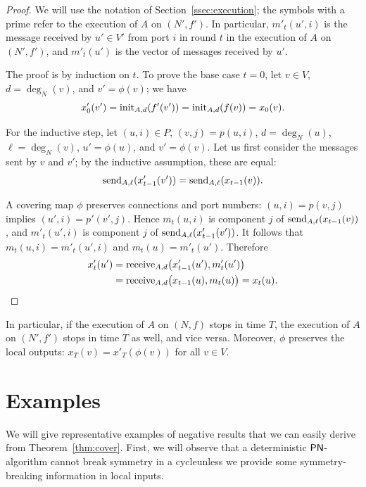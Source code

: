 \begin{proof}
    We will use the notation of Section~\ref{ssec:execution}; the symbols with a prime refer to the execution of $A$ on $(N'\!,f')$. In particular, $m'_t(u',i)$ is the message received by $u' \in V'$ from port $i$ in round $t$ in the execution of $A$ on $(N'\!,f')$, and $m'_t(u')$ is the vector of messages received by $u'$.
    
    The proof is by induction on $t$. To prove the base case $t = 0$, let $v \in V$, $d = \deg_N(v)$, and $v' = \phi(v)$; we have
    \[
        x'_0(v') = \operatorname{init}_{A,d}(f'(v')) = \operatorname{init}_{A,d}(f(v)) = x_0(v).
    \]
    
    For the inductive step, let $(u,i) \in P$, $(v,j) = p(u,i)$, $d = \deg_N(u)$, $\ell = \deg_N(v)$, $u' = \phi(u)$, and $v' = \phi(v)$. Let us first consider the messages sent by $v$ and $v'$; by the inductive assumption, these are equal:
    \[
        \operatorname{send}_{A,\ell}(x'_{t-1}(v')) = \operatorname{send}_{A,\ell}(x_{t-1}(v)).
    \]
    
    A covering map $\phi$ preserves connections and port numbers: $(u,i) = p(v,j)$ implies $(u',i) = p'(v',j)$. Hence $m_t(u,i)$ is component $j$ of $\operatorname{send}_{A,\ell}(x_{t-1}(v))$, and $m'_t(u',i)$ is component $j$ of $\operatorname{send}_{A,\ell}(x'_{t-1}(v'))$. It follows that $m_t(u,i) = m'_t(u',i)$ and $m_t(u) = m'_t(u')$. Therefore
    \begin{align*}
        x'_t(u')
        &= \operatorname{receive}_{A,d}\bigl(x'_{t-1}(u'), m'_t(u') \bigr) \\
        &= \operatorname{receive}_{A,d}\bigl(x_{t-1}(u), m_t(u) \bigr)
        = x_t(u). \qedhere
    \end{align*}
\end{proof}

In particular, if the execution of $A$ on $(N,f)$ stops in time $T$, the execution of $A$ on $(N'\!,f')$ stops in time $T$ as well, and vice versa. Moreover, $\phi$ preserves the local outputs: $x_T(v) = x'_T(\phi(v))$ for all $v \in V$.

\section{Examples}

We will give representative examples of negative results that we can easily derive from Theorem~\ref{thm:cover}. First, we will observe that a deterministic $\textup{\sffamily PN}$-algorithm cannot break symmetry in a cycle\mydash unless we provide some symmetry-breaking information in local inputs.

